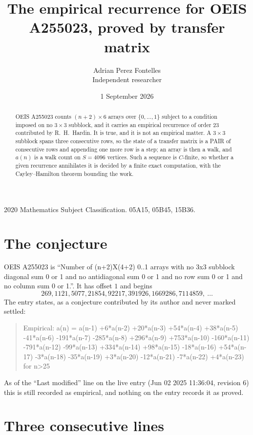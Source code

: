 \documentclass[11pt,a4paper]{article}
\title{The empirical recurrence for OEIS A255023, proved by transfer matrix}
\author{Adrian Perez Fontelles\\ \small Independent researcher}
\date{1 September 2026}
\theoremstyle{plain}
\theoremstyle{definition}
\begin{document}
\maketitle

\begin{abstract}
OEIS A255023 counts $(n+2)\times6$ arrays over $\{0,\dots,1\}$ subject to a condition imposed on
no $3\times3$ subblock, and it carries an empirical recurrence of order $23$
contributed by R.~H.~Hardin. It is true, and it is not an empirical matter. A $3\times3$
subblock spans three consecutive rows, so the state of a transfer matrix is a PAIR of
consecutive rows and appending one more row is a step; an array is then a walk, and
$a(n)$ is a walk count on $S=4096$ vertices. Such a sequence is $C$-finite, so whether a given
recurrence annihilates it is decided by a finite exact computation, with the Cayley--Hamilton
theorem bounding the work.
\end{abstract}

\noindent\small 2020 Mathematics Subject Classification. 05A15, 05B45, 15B36.\normalsize

\section{The conjecture}

OEIS A255023 is ``Number of (n+2)X(4+2) 0..1 arrays with no 3x3 subblock diagonal sum 0 or 1 and no antidiagonal sum 0 or 1 and no row sum 0 or 1 and no column sum 0 or 1.''. It has offset $1$ and begins
\[
269, 1121, 5077, 21854, 92217, 391926, 1669286, 7114859,\ \dots
\]
The entry states, as a conjecture contributed by its author and never marked settled:
\begin{quote}
Empirical: a(n) = a(n-1) +6*a(n-2) +20*a(n-3) +54*a(n-4) +38*a(n-5) -41*a(n-6) -191*a(n-7) -285*a(n-8) +296*a(n-9) +753*a(n-10) -160*a(n-11) -791*a(n-12) -99*a(n-13) +334*a(n-14) +98*a(n-15) -18*a(n-16) +54*a(n-17) -3*a(n-18) -35*a(n-19) +3*a(n-20) -12*a(n-21) -7*a(n-22) +4*a(n-23) for n>25
\end{quote}
As of the ``Last modified'' line on the live entry (Jun 02 2025 11:36:04, revision 6) this is still
recorded as empirical, and nothing on the entry records it as proved.

\section{Three consecutive lines}
\end{document}
